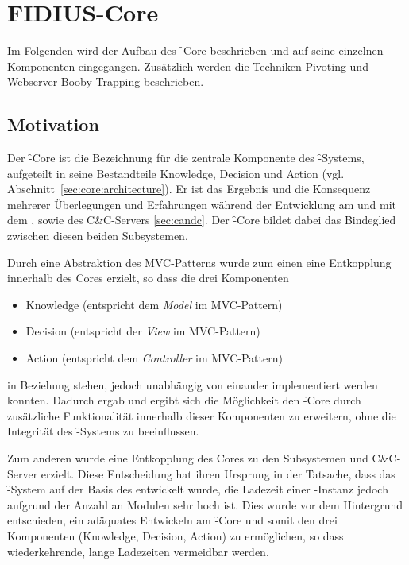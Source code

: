 \section{FIDIUS-Core}
\label{sec:core}
\authors{\CA \and \HM \and \MW}{\AB \and \DE \and \LM}

Im Folgenden wird der Aufbau des \f-Core beschrieben und
auf seine einzelnen Komponenten eingegangen. Zusätzlich
werden die Techniken Pivoting und Webserver Booby Trapping
beschrieben.

\subsection{Motivation}

Der \f-Core ist die Bezeichnung für die zentrale Komponente des
\f-Systems, aufgeteilt in seine Bestandteile Knowledge, Decision und
Action (vgl. Abschnitt~\ref{sec:core:architecture}). Er ist das Ergebnis und die
Konsequenz mehrerer Überlegungen und Erfahrungen während der
Entwicklung am und mit dem , sowie des C\&C-Servers
\ref{sec:candc}. Der \f-Core bildet dabei das Bindeglied zwischen
diesen beiden Subsystemen.

Durch eine Abstraktion des MVC-Patterns wurde zum einen eine
Entkopplung innerhalb des Cores erzielt, so dass die drei Komponenten

\begin{itemize}
  \item Knowledge (entspricht dem \textit{Model} im MVC-Pattern)
  \item Decision  (entspricht der \textit{View} im MVC-Pattern)
  \item Action    (entspricht dem \textit{Controller} im MVC-Pattern)
\end{itemize}

in Beziehung stehen, jedoch unabhängig von einander implementiert
werden konnten. Dadurch ergab und ergibt sich die Möglichkeit den
\f-Core durch zusätzliche Funktionalität innerhalb dieser Komponenten
zu erweitern, ohne die Integrität des \f-Systems zu beeinflussen.

Zum anderen wurde eine Entkopplung des Cores zu den Subsystemen
 und C\&C-Server erzielt. Diese Entscheidung hat ihren
Ursprung in der Tatsache, dass das \f-System auf der Basis des
 entwickelt wurde, die Ladezeit einer -Instanz
jedoch aufgrund der Anzahl an Modulen sehr hoch ist. Dies wurde vor
dem Hintergrund entschieden, ein adäquates Entwickeln am \f-Core und
somit den drei Komponenten (Knowledge, Decision, Action) zu
ermöglichen, so dass wiederkehrende, lange Ladezeiten vermeidbar
werden.

